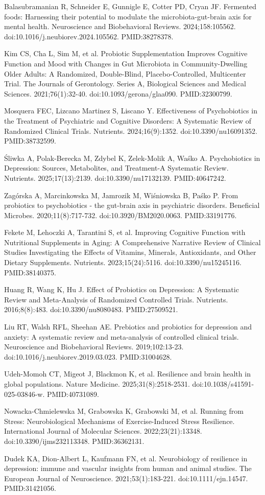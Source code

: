 \documentclass[11pt,oneside]{book}
\newcommand{\refend}{\endgroup\par}
\newcommand{\reff}[2]{\par\hangindent=7mm\hangafter=1\noindent[#1]\hspace{2mm}#2\par}
\begin{document}
\reff{56}{Balasubramanian R, Schneider E, Gunnigle E, Cotter PD, Cryan JF. Fermented foods: Harnessing their potential to modulate the microbiota-gut-brain axis for mental health. Neuroscience and Biobehavioral Reviews. 2024;158:105562. doi:10.1016/j.neubiorev.2024.105562. PMID:38278378.}
\reff{57}{Kim CS, Cha L, Sim M, et al. Probiotic Supplementation Improves Cognitive Function and Mood with Changes in Gut Microbiota in Community-Dwelling Older Adults: A Randomized, Double-Blind, Placebo-Controlled, Multicenter Trial. The Journals of Gerontology. Series A, Biological Sciences and Medical Sciences. 2021;76(1):32-40. doi:10.1093/gerona/glaa090. PMID:32300799.}
\reff{58}{Mosquera FEC, Lizcano Martinez S, Liscano Y. Effectiveness of Psychobiotics in the Treatment of Psychiatric and Cognitive Disorders: A Systematic Review of Randomized Clinical Trials. Nutrients. 2024;16(9):1352. doi:10.3390/nu16091352. PMID:38732599.}
\reff{59}{Śliwka A, Polak-Berecka M, Zdybel K, Zelek-Molik A, Waśko A. Psychobiotics in Depression: Sources, Metabolites, and Treatment-A Systematic Review. Nutrients. 2025;17(13):2139. doi:10.3390/nu17132139. PMID:40647242.}
\reff{60}{Zagórska A, Marcinkowska M, Jamrozik M, Wiśniowska B, Paśko P. From probiotics to psychobiotics - the gut-brain axis in psychiatric disorders. Beneficial Microbes. 2020;11(8):717-732. doi:10.3920/BM2020.0063. PMID:33191776.}
\reff{61}{Fekete M, Lehoczki A, Tarantini S, et al. Improving Cognitive Function with Nutritional Supplements in Aging: A Comprehensive Narrative Review of Clinical Studies Investigating the Effects of Vitamins, Minerals, Antioxidants, and Other Dietary Supplements. Nutrients. 2023;15(24):5116. doi:10.3390/nu15245116. PMID:38140375.}
\reff{62}{Huang R, Wang K, Hu J. Effect of Probiotics on Depression: A Systematic Review and Meta-Analysis of Randomized Controlled Trials. Nutrients. 2016;8(8):483. doi:10.3390/nu8080483. PMID:27509521.}
\reff{63}{Liu RT, Walsh RFL, Sheehan AE. Prebiotics and probiotics for depression and anxiety: A systematic review and meta-analysis of controlled clinical trials. Neuroscience and Biobehavioral Reviews. 2019;102:13-23. doi:10.1016/j.neubiorev.2019.03.023. PMID:31004628.}
\reff{64}{Udeh-Momoh CT, Migeot J, Blackmon K, et al. Resilience and brain health in global populations. Nature Medicine. 2025;31(8):2518-2531. doi:10.1038/s41591-025-03846-w. PMID:40731089.}
\reff{65}{Nowacka-Chmielewska M, Grabowska K, Grabowski M, et al. Running from Stress: Neurobiological Mechanisms of Exercise-Induced Stress Resilience. International Journal of Molecular Sciences. 2022;23(21):13348. doi:10.3390/ijms232113348. PMID:36362131.}
\reff{66}{Dudek KA, Dion-Albert L, Kaufmann FN, et al. Neurobiology of resilience in depression: immune and vascular insights from human and animal studies. The European Journal of Neuroscience. 2021;53(1):183-221. doi:10.1111/ejn.14547. PMID:31421056.}
\refend
\end{document}
